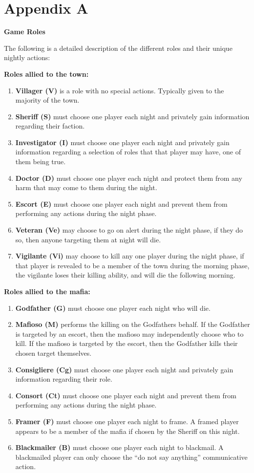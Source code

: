 \section{Appendix A}\label{app:A}
\begin{center}
	\textbf{Game Roles}
\end{center}
The following is a detailed description of the different roles and their unique
nightly actions:

\textbf{Roles allied to the town:}
\begin{enumerate}
	\item\textbf{Villager (V)} is a  role with no special actions. Typically 
	given 
	to the majority of the town.
	\item\textbf{Sheriff (S)} must choose one player each night and privately 
	gain 
	information regarding their faction.
	\item\textbf{Investigator (I)} must choose one player each night and 
	privately 
	gain information regarding a selection of roles that that player may have, 
	one of them being true.
	\item\textbf{Doctor (D)} must choose one player each night and protect them 
	from any harm that may come to them during the night.
	\item\textbf{Escort (E)} must choose one player each night and prevent them 
	from performing any actions during the night phase.
	\item\textbf{Veteran (Ve)} may choose to go on alert during the night 
	phase, if 
	they do so, then anyone targeting them at night will die.
	\item\textbf{Vigilante (Vi)} may choose to kill any one player during the 
	night 
	phase, if that player is revealed to be a member of the town during the 
	morning phase, the vigilante loses their killing ability, and will die the 
	following morning.
\end{enumerate}
\textbf{Roles allied to the mafia:}
\begin{enumerate}
	\item\textbf{Godfather (G)} must choose one player each night who will die.
	\item\textbf{Mafioso (M)} performs the killing on the Godfathers behalf. If 
	the 
	Godfather is targeted by an escort, then the mafioso may independently 
	choose who to kill. If the mafioso is targeted by the escort, then the 
	Godfather kills their chosen target themselves.
	\item\textbf{Consigliere (Cg)} must choose one player each night and 
	privately 
	gain information regarding their role.
	\item\textbf{Consort (Ct)} must choose one player each night and prevent 
	them 
	from performing any actions during the night phase.
	\item\textbf{Framer (F)} must choose one player each night to frame. A 
	framed 
	player appears to be a member of the mafia if chosen by the Sheriff on this 
	night.
	\item\textbf{Blackmailer (B)} must choose one player each night to 
	blackmail. A 
	blackmailed player can only choose the “do not say anything” communicative 
	action.
\end{enumerate}